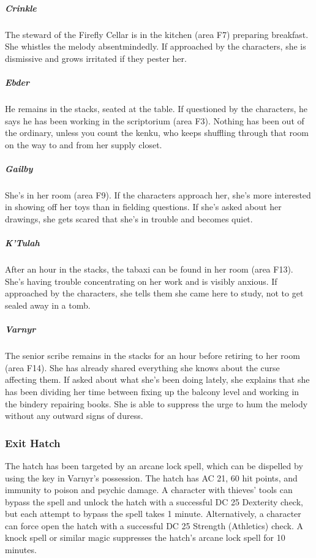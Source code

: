 \documentclass[10pt,a4paper,twoside,bg=print,twocolumn,openany,nodeprecatedcode]{dndbook}
\begin{document}
\subparagraph{Crinkle}
The steward of the Firefly Cellar is in the kitchen (area F7) preparing breakfast. She whistles the melody absentmindedly. If approached by the characters, she is dismissive and grows irritated if they pester her.

\subparagraph{Ebder}
He remains in the stacks, seated at the table. If questioned by the characters, he says he has been working in the scriptorium (area F3). Nothing has been out of the ordinary, unless you count the kenku, who keeps shuffling through that room on the way to and from her supply closet.

\subparagraph{Gailby}
She's in her room (area F9). If the characters approach her, she's more interested in showing off her toys than in fielding questions. If she's asked about her drawings, she gets scared that she's in trouble and becomes quiet.

\subparagraph{K'Tulah}
After an hour in the stacks, the tabaxi can be found in her room (area F13). She's having trouble concentrating on her work and is visibly anxious. If approached by the characters, she tells them she came here to study, not to get sealed away in a tomb.

\subparagraph{Varnyr}
The senior scribe remains in the stacks for an hour before retiring to her room (area F14). She has already shared everything she knows about the curse affecting them. If asked about what she's been doing lately, she explains that she has been dividing her time between fixing up the balcony level and working in the bindery repairing books. She is able to suppress the urge to hum the melody without any outward signs of duress.

\subsubsection{Exit Hatch}
The hatch has been targeted by an arcane lock spell, which can be dispelled by using the key in Varnyr's possession. The hatch has AC 21, 60 hit points, and immunity to poison and psychic damage. A character with thieves' tools can bypass the spell and unlock the hatch with a successful DC 25 Dexterity check, but each attempt to bypass the spell takes 1 minute. Alternatively, a character can force open the hatch with a successful DC 25 Strength (Athletics) check. A knock spell or similar magic suppresses the hatch's arcane lock spell for 10 minutes.
\end{document}
